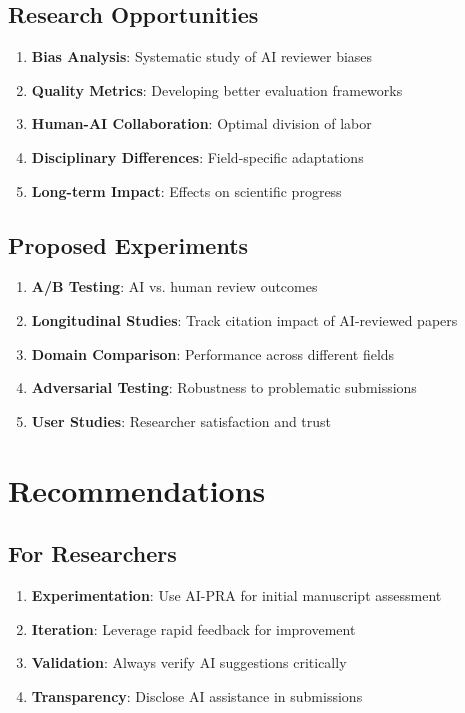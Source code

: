 \documentclass[11pt,a4paper]{article}
\begin{document}
\subsection{Research Opportunities}

\begin{enumerate}
    \item \textbf{Bias Analysis}: Systematic study of AI reviewer biases
    \item \textbf{Quality Metrics}: Developing better evaluation frameworks
    \item \textbf{Human-AI Collaboration}: Optimal division of labor
    \item \textbf{Disciplinary Differences}: Field-specific adaptations
    \item \textbf{Long-term Impact}: Effects on scientific progress
\end{enumerate}

\subsection{Proposed Experiments}

\begin{enumerate}
    \item \textbf{A/B Testing}: AI vs. human review outcomes
    \item \textbf{Longitudinal Studies}: Track citation impact of AI-reviewed papers
    \item \textbf{Domain Comparison}: Performance across different fields
    \item \textbf{Adversarial Testing}: Robustness to problematic submissions
    \item \textbf{User Studies}: Researcher satisfaction and trust
\end{enumerate}

\section{Recommendations}

\subsection{For Researchers}

\begin{enumerate}
    \item \textbf{Experimentation}: Use AI-PRA for initial manuscript assessment
    \item \textbf{Iteration}: Leverage rapid feedback for improvement
    \item \textbf{Validation}: Always verify AI suggestions critically
    \item \textbf{Transparency}: Disclose AI assistance in submissions
\end{enumerate}
\end{document}
